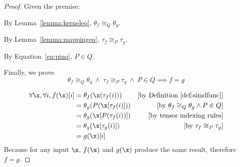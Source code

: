 \begin{proof}
Given the premise:
    \begin{myitemize2}
        \item By Lemma~\ref{lemma:kerneleq}, $\theta_f \cong_Q \theta_g$.
        \item By Lemma~\ref{lemma:mappingeq}, $\tau_f \cong_P \tau_g$.
        \item By Equation~\ref{eq:pinq}, $P \in Q$.
    \end{myitemize2}

%

Finally, we prove
\[
\theta_f \cong_Q \theta_g\ \land\
\tau_f \cong_P \tau_g \ \land \
P\in Q \implies f=g
\]

\begin{align*}
\forall \x, \forall i, f(\x)[i]
   &= \theta_f(\x(\tau_f(i)))      &\text{[by Definition~\ref{def:simdfunc}]}\\
   &= \theta_g(P(\x[\tau_f(i)]))   &\text{[by $\theta_f\cong_Q \theta_g \land P\in Q$]}\\
   &= \theta_g(\x[P(\tau_f(i))])   &\text{[by tensor indexing rules]}\\
   &= \theta_g(\x[\tau_g(i)])      &\text{[by $\tau_f \cong_P \tau_g$]}\\
   &= g(\x)[i]
\end{align*}
Because for any input $\x$, $f(\x)$ and $g(\x)$ produce the same result,
therefore $f=g$.

\end{proof}
